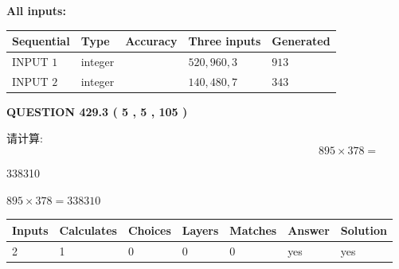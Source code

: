\documentclass{ctexart}
\begin{document}
   
   
   
\noindent\vspace{0.1in}\hspace{-0.08in} {\textbf{\Large{All inputs: }}}
   
   
  
  
\noindent\begin{tabular}{|l|l|l|l|l|}
\hline
 Sequential & Type & Accuracy & Three inputs & Generated \\ 
\hline
 
 
  INPUT $  1 $ & integer &  & $
 520
 , 
 960
 , 
 3
 $ & $ 913 $ 
 \\  \hline  
 
 
  INPUT $  2 $ & integer &  & $
 140
 , 
 480
 , 
 7
 $ & $ 343 $ 
 \\  \hline  
 \end{tabular}
   
   
  
\vspace{0.2in}
  
{\textbf{\Large{QUESTION
429.3 
 ( 5 , 5 , 105 )
}}}
  
  
 
请计算:
\begin{equation}
895  \times    %
378 = \nonumber
\end{equation}
 
 
 
\noindent{}
 
 

338310
 
 
\noindent{}
 
 

 
 
 
\noindent{}
 
 

$ %
895 \times  %
378=   %
338310$
 
 
\noindent{}
 
 

 
   
   
   
   
\noindent\begin{tabular}{|l|l|l|l|l|l|l|}
 \hline
Inputs & Calculates & Choices & Layers & Matches & Answer & Solution \\ \hline
 2  & 
 1  & 
 0
  & 
 0  & 
 0  & 
  yes & 
  yes 
  \\ \hline
 \end{tabular}
   
\end{document}
